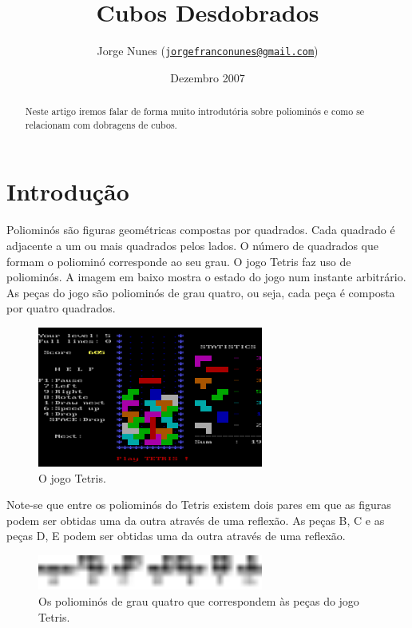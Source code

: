 \documentclass[11pt]{article}
\title{Cubos Desdobrados}
\author{Jorge Nunes ({\tt\href{mailto:jorgefranconunes@gmail.com}{jorgefranconunes@gmail.com}})}
\date{Dezembro 2007}
\begin{document}
\maketitle

\begin{abstract}
\noindent Neste artigo iremos falar de forma muito introdutória sobre
poliominós e como se relacionam com dobragens de cubos.
\end{abstract}





\section{Introdução}

Poliominós são figuras geométricas compostas por quadrados. Cada
quadrado é adjacente a um ou mais quadrados pelos lados. O número de
quadrados que formam o poliominó corresponde ao seu grau. O jogo
Tetris faz uso de poliominós. A imagem em baixo mostra o estado do
jogo num instante arbitrário. As peças do jogo são poliominós de grau
quatro, ou seja, cada peça é composta por quatro quadrados.

\begin{figure}[H]
  \centering
  \includegraphics[width=0.66\textwidth]{../images/tetris.png}
  \caption{O jogo Tetris.}
\end{figure}


Note-se que entre os poliominós do Tetris existem dois pares em que as
figuras podem ser obtidas uma da outra através de uma reflexão. As
peças B, C e as peças D, E podem ser obtidas uma da outra através de
uma reflexão.

\begin{figure}[H]
  \centering
  \includegraphics[width=0.66\textwidth]{../images/poliominos-tetris.pdf}
  \caption{Os poliominós de grau quatro que correspondem às peças do jogo
    Tetris.}
\end{figure}
\end{document}
